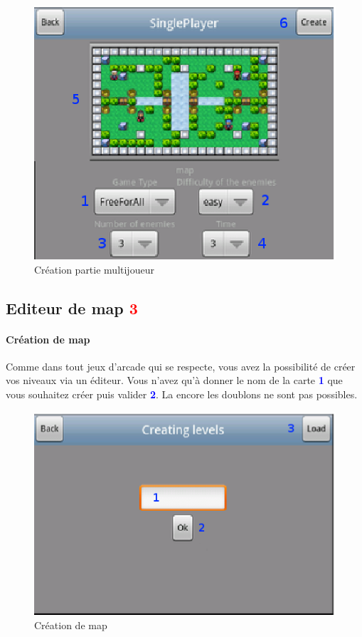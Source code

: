 	\begin{figure}[H]
	\centering
		\includegraphics[scale=0.7]{Manuel/Img/15}
		\caption{Création partie multijoueur}
	\end{figure}
	
	
\subsection{Editeur de map \textcolor{red}{3} }
	
	\paragraph{Création de map\\}
	Comme dans tout jeux d'arcade qui se respecte, vous avez la possibilité de
	créer vos niveaux via un éditeur. Vous n'avez qu'à donner le nom de la carte
	\textcolor{blue}{\textbf{1}}	que vous souhaitez créer puis valider
	\textcolor{blue}{\textbf{2}}. La encore les doublons ne sont pas possibles.
	
	\begin{figure}[H]
		\centering
			\includegraphics[scale=0.7]{Manuel/Img/10}
			\caption{Création de map}
		\end{figure}

